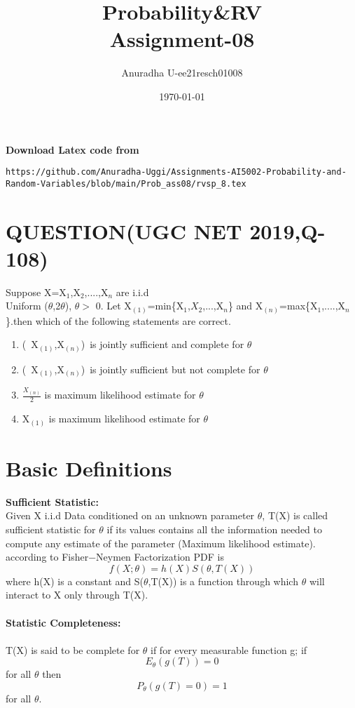 \documentclass[journal,12pt,twocolumn]{IEEEtran}
\title{Probability\&RV \\ Assignment-08}
\author{Anuradha U-ee21resch01008}
\date{\today}
\begin{document}
\maketitle
\newpage
\bigskip
\renewcommand{\thefigure}{\theenumi}
\renewcommand{\thetable}{\theenumi}


\textbf{Download Latex code from}
\begin{lstlisting}
https://github.com/Anuradha-Uggi/Assignments-AI5002-Probability-and-Random-Variables/blob/main/Prob_ass08/rvsp_8.tex
\end{lstlisting}
\section{\textbf{QUESTION(UGC NET 2019,Q-108)}}
Suppose X=X$_1$,X$_2$,....,X$_n$ are i.i.d \\ Uniform  ($\theta$,2$\theta$),
 $\theta>$ 0. Let X$_{(1)}$=min\{X$_1$,$X_2$,...,X$_n$\} and 
X$_{(n)}$=max\{X$_1$,....,X$_n$\}.then which of the following statements are correct.\\
\begin{enumerate}
    \item (\ X$_{(1)}$,X$_{(n)}$)\ is jointly sufficient and complete for $\theta$
    \item (\ X$_{(1)}$,X$_{(n)}$)\ is jointly sufficient but not complete for
    $\theta$
    \item $\frac{X_{(n)}}{2}$ is maximum likelihood estimate for $\theta$
    \item X$_{(1)}$ is maximum likelihood estimate for $\theta$
    
\end{enumerate}
\section{\textbf{Basic Definitions}}
\textbf{Sufficient Statistic:}\\
Given X i.i.d Data conditioned on an unknown parameter $\theta$, T(X) is called sufficient statistic for $\theta$ if its values contains all the information needed to compute any estimate of the parameter (Maximum likelihood estimate). according to Fisher$-$Neymen Factorization PDF is \\

\begin{equation}
    f(X;\theta)=h(X)S(\theta,T(X))
\end{equation}
where h(X) is a constant and S($\theta$,T(X)) is a function through which $\theta$ will interact to X only through T(X).\\ \\
\textbf{Statistic Completeness:}\\ \\
T(X) is said to be complete for $\theta$ if for every measurable function g;
if 
\begin{equation}
    {E_\theta}(g(T))=0 
\end{equation}
for all $\theta$ then
\begin{equation}
    P_\theta(g(T)=0)=1 
\end{equation}
for all $\theta$.\\
\end{document}
